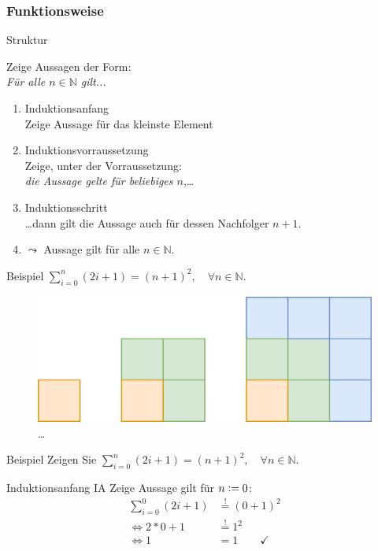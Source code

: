 \subsubsection{Funktionsweise}
\begin{frame}[fragile]{Struktur}
    \begin{alertblock}{Zeige Aussagen der Form:\\\emph{Für alle $n\in\mathbb{N}$ gilt...}}
    \begin{enumerate}
        \item \alert{Induktionsanfang}\\Zeige Aussage für das kleinste Element
        \item \alert{Induktionsvorraussetzung}\\Zeige, unter der Vorraussetzung: \\\emph{die Aussage gelte für beliebiges $n$},\dots
        \item \alert{Induktionsschritt}\\\dots dann gilt die Aussage auch für dessen Nachfolger $n+1$.
        \item $\leadsto$ Aussage gilt für alle $n \in \mathbb{N}$.
    \end{enumerate}
    \end{alertblock}
\end{frame}

\begin{frame}[fragile]{Beispiel}
\center $\displaystyle\sum_{i = 0}^{n} (2i+1) = (n+1)^2,\quad\forall n \in\mathbb{N}$.
    \begin{figure}
        \centering
        \includegraphics[width=0.5\textheight]{../figures/Summe.png}\qquad \dots
    \end{figure}
\end{frame}

\begin{frame}[fragile]{Beispiel}
Zeigen Sie $\displaystyle\sum_{i = 0}^{n} (2i+1) = (n+1)^2,\quad\forall n \in\mathbb{N}$.
\begin{alertblock}{Induktionsanfang IA}
    Zeige Aussage gilt für $n\vcentcolon=0$:\\
    \begin{align*}
        \sum_{i = 0}^{0} (2i+1) &\overset{!}{=} (0+1)^2\\
        \iff 2 * 0 + 1 &\overset{!}{=}1^2\\
        \iff 1 &= 1 \qquad\checkmark
    \end{align*}
\end{alertblock}
\end{frame}


